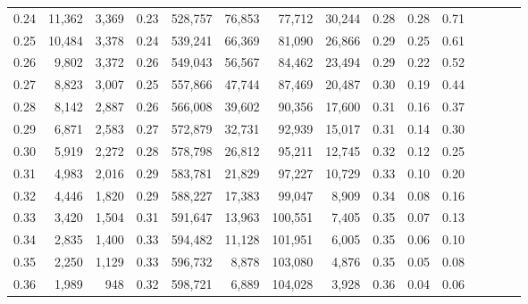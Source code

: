 \begin{tabular}{rrrcrrrrrrrrrrr}
0.24 &  11,362 &  3,369 &                                       0.23 &  528,757 &   76,853 &   77,712 &   30,244 &  0.28 &  0.28 &                         0.71 \\
0.25 &  10,484 &  3,378 &                                       0.24 &  539,241 &   66,369 &   81,090 &   26,866 &  0.29 &  0.25 &                         0.61 \\
0.26 &   9,802 &  3,372 &                                       0.26 &  549,043 &   56,567 &   84,462 &   23,494 &  0.29 &  0.22 &                         0.52 \\
0.27 &   8,823 &  3,007 &                                       0.25 &  557,866 &   47,744 &   87,469 &   20,487 &  0.30 &  0.19 &                         0.44 \\
0.28 &   8,142 &  2,887 &                                       0.26 &  566,008 &   39,602 &   90,356 &   17,600 &  0.31 &  0.16 &                         0.37 \\
0.29 &   6,871 &  2,583 &                                       0.27 &  572,879 &   32,731 &   92,939 &   15,017 &  0.31 &  0.14 &                         0.30 \\
0.30 &   5,919 &  2,272 &                                       0.28 &  578,798 &   26,812 &   95,211 &   12,745 &  0.32 &  0.12 &                         0.25 \\
0.31 &   4,983 &  2,016 &                                       0.29 &  583,781 &   21,829 &   97,227 &   10,729 &  0.33 &  0.10 &                         0.20 \\
0.32 &   4,446 &  1,820 &                                       0.29 &  588,227 &   17,383 &   99,047 &    8,909 &  0.34 &  0.08 &                         0.16 \\
0.33 &   3,420 &  1,504 &                                       0.31 &  591,647 &   13,963 &  100,551 &    7,405 &  0.35 &  0.07 &                         0.13 \\
0.34 &   2,835 &  1,400 &                                       0.33 &  594,482 &   11,128 &  101,951 &    6,005 &  0.35 &  0.06 &                         0.10 \\
0.35 &   2,250 &  1,129 &                                       0.33 &  596,732 &    8,878 &  103,080 &    4,876 &  0.35 &  0.05 &                         0.08 \\
0.36 &   1,989 &    948 &                                       0.32 &  598,721 &    6,889 &  104,028 &    3,928 &  0.36 &  0.04 &                         0.06 \\

\end{tabular}
